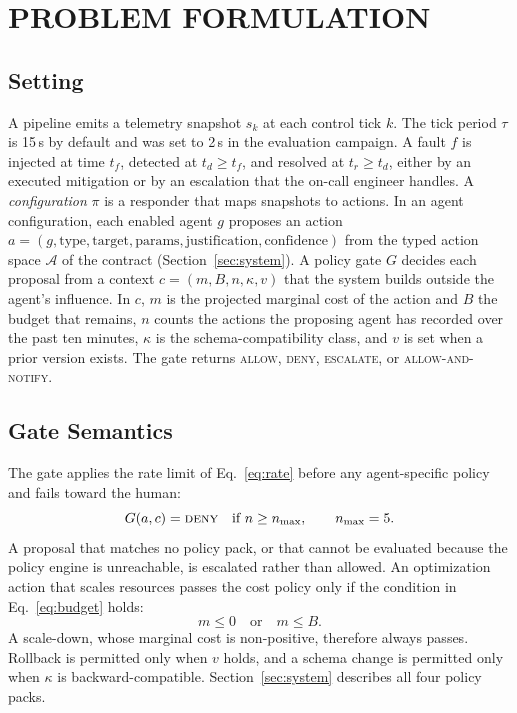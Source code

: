 \section{PROBLEM FORMULATION}\label{sec:problem}

\subsection{Setting}
A pipeline emits a telemetry snapshot $s_k$ at each control tick $k$. The tick period $\tau$ is 15\,s
by default and was set to 2\,s in the evaluation campaign. A fault $f$ is injected at time $t_f$,
detected at $t_d \ge t_f$, and resolved at $t_r \ge t_d$, either by an executed mitigation or by an
escalation that the on-call engineer handles. A \emph{configuration} $\pi$ is a responder that maps
snapshots to actions. In an agent configuration, each enabled agent $g$ proposes an action
$a = (g, \text{type}, \text{target}, \text{params}, \text{justification}, \text{confidence})$ from the
typed action space $\mathcal{A}$ of the contract (Section~\ref{sec:system}). A policy gate $G$
decides each proposal from a context $c = (m, B, n, \kappa, v)$ that the system builds outside the
agent's influence. In $c$, $m$ is the projected marginal cost of the action and $B$ the budget that
remains, $n$ counts the actions the proposing agent has recorded over the past ten minutes, $\kappa$
is the schema-compatibility class, and $v$ is set when a prior version exists. The gate
returns \textsc{allow}, \textsc{deny}, \textsc{escalate}, or \textsc{allow-and-notify}.

\subsection{Gate Semantics}
The gate applies the rate limit of Eq.~\eqref{eq:rate} before any agent-specific policy and fails
toward the human:
\begin{equation}
  G(a,c) = \textsc{deny} \quad \text{if } n \ge n_{\max}, \qquad n_{\max}=5.
  \label{eq:rate}
\end{equation}
A proposal that matches no policy pack, or that cannot be evaluated because the policy engine is
unreachable, is escalated rather than allowed. An optimization action that scales resources passes
the cost policy only if the condition in Eq.~\eqref{eq:budget} holds:
\begin{equation}
  m \le 0 \quad \text{or} \quad m \le B.
  \label{eq:budget}
\end{equation}
A scale-down, whose marginal cost is non-positive, therefore always passes. Rollback is permitted only
when $v$ holds, and a schema change is permitted only when $\kappa$ is backward-compatible.
Section~\ref{sec:system} describes all four policy packs.


